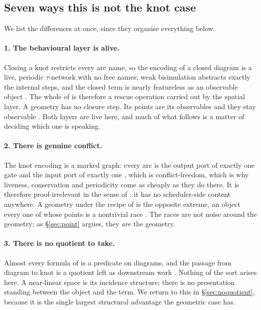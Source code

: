 \documentclass[11pt]{article}
\theoremstyle{plain}
\theoremstyle{definition}
\begin{document}
\subsection{Seven ways this is not the knot case}
\label{sec:seven}

We list the differences at once, since they organise everything below.

\paragraph{1. The behavioural layer is alive.}
Closing a knot restricts every arc name, so the encoding of a closed diagram is a live, periodic
$\tau$-network with no free names; weak bisimulation abstracts exactly the internal steps, and the
closed term is nearly featureless as an observable object \cite[\S10]{Knots}. The whole of
\cite{Classifier} is therefore a rescue operation carried out by the spatial layer. A geometry has
no closure step. Its points are its observables and they stay observable \cite[\S8]{Geometry}. Both
layers are live here, and much of what follows is a matter of deciding which one is speaking.

\paragraph{2. There is genuine conflict.}
The knot encoding is a marked graph: every arc is the output port of exactly one gate and the input
port of exactly one \cite[Prop.~1]{Knots}, which is conflict-freedom, which is why liveness,
conservation and periodicity come as cheaply as they do there. It is therefore proof-irrelevant in
the sense of \cite{Choice}: it has no scheduler-side content anywhere. A geometry under the recipe
of \cite{Geometry} is the opposite extreme, an object every one of whose points is a nontrivial
race \cite[Rem.~18]{Geometry}. The races are not noise around the geometry; as \S\ref{sec:point}
argues, they \emph{are} the geometry.

\paragraph{3. There is no quotient to take.}
Almost every formula of \cite{Classifier} is a predicate on diagrams, and the passage from
diagram to knot is a quotient left as downstream work \cite[\S5]{Classifier}. Nothing of the sort
arises here. A near-linear space is its incidence structure; there is no presentation standing
between the object and the term. We return to this in \S\ref{sec:noquotient}, because it is the
single largest structural advantage the geometric case has.
\end{document}
